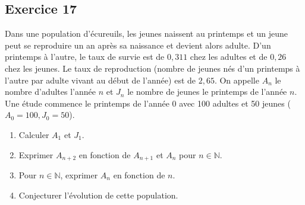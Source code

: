 \documentclass[11pt,a4paper]{article}
\newcommand{\N}{\mathbb{N}}
\begin{document}
\subsection*{Exercice 17}
Dans une population d'écureuils, les jeunes naissent au printemps et un jeune peut se reproduire un an après sa naissance et devient alors adulte. D'un printemps à l'autre, le taux de survie est de $0{,}311$ chez les adultes et de $0{,}26$ chez les jeunes. Le taux de reproduction (nombre de jeunes nés d'un printemps à l'autre par adulte vivant au début de l'année) est de $2{,}65$. On appelle $A_n$ le nombre d'adultes l'année $n$ et $J_n$ le nombre de jeunes le printemps de l'année $n$. Une étude commence le printemps de l'année 0 avec 100 adultes et 50 jeunes ($A_0 = 100, J_0 = 50$).
\begin{enumerate}
    \item Calculer $A_1$ et $J_1$.
    \item Exprimer $A_{n+2}$ en fonction de $A_{n+1}$ et $A_n$ pour $n \in \N$.
    \item Pour $n \in \N$, exprimer $A_n$ en fonction de $n$.
    \item Conjecturer l'évolution de cette population.
\end{enumerate}
\end{document}
